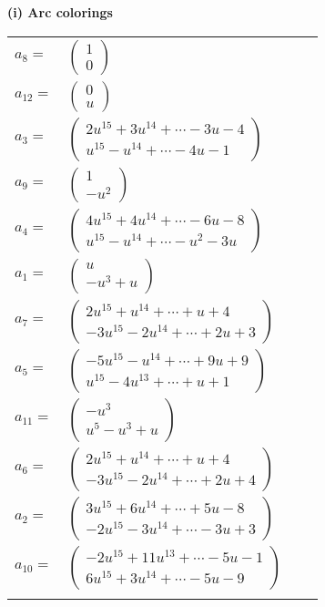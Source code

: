 \documentclass[1p]{elsarticle_modified}
\theoremstyle{definition}
\begin{document}
\flushleft \textbf{(i) Arc colorings}\\
\begin{tabular}{m{7pt} m{180pt} m{7pt} m{180pt} }
\flushright $a_{8}=$&$\begin{pmatrix}1\\0\end{pmatrix}$ \\
\flushright $a_{12}=$&$\begin{pmatrix}0\\u\end{pmatrix}$ \\
\flushright $a_{3}=$&$\begin{pmatrix}2 u^{15}+3 u^{14}+\cdots-3 u-4\\u^{15}- u^{14}+\cdots-4 u-1\end{pmatrix}$ \\
\flushright $a_{9}=$&$\begin{pmatrix}1\\- u^2\end{pmatrix}$ \\
\flushright $a_{4}=$&$\begin{pmatrix}4 u^{15}+4 u^{14}+\cdots-6 u-8\\u^{15}- u^{14}+\cdots- u^2-3 u\end{pmatrix}$ \\
\flushright $a_{1}=$&$\begin{pmatrix}u\\- u^3+u\end{pmatrix}$ \\
\flushright $a_{7}=$&$\begin{pmatrix}2 u^{15}+u^{14}+\cdots+u+4\\-3 u^{15}-2 u^{14}+\cdots+2 u+3\end{pmatrix}$ \\
\flushright $a_{5}=$&$\begin{pmatrix}-5 u^{15}- u^{14}+\cdots+9 u+9\\u^{15}-4 u^{13}+\cdots+u+1\end{pmatrix}$ \\
\flushright $a_{11}=$&$\begin{pmatrix}- u^3\\u^5- u^3+u\end{pmatrix}$ \\
\flushright $a_{6}=$&$\begin{pmatrix}2 u^{15}+u^{14}+\cdots+u+4\\-3 u^{15}-2 u^{14}+\cdots+2 u+4\end{pmatrix}$ \\
\flushright $a_{2}=$&$\begin{pmatrix}3 u^{15}+6 u^{14}+\cdots+5 u-8\\-2 u^{15}-3 u^{14}+\cdots-3 u+3\end{pmatrix}$ \\
\flushright $a_{10}=$&$\begin{pmatrix}-2 u^{15}+11 u^{13}+\cdots-5 u-1\\6 u^{15}+3 u^{14}+\cdots-5 u-9\end{pmatrix}$\\&\end{tabular}
\end{document}
